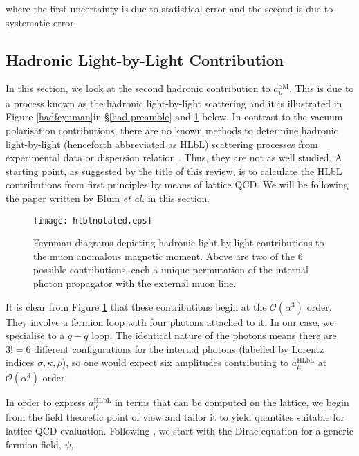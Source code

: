 \documentclass{article}
\numberwithin{equation}{section} %
\begin{document}
\noindent where the first uncertainty is due to statistical error and the second is due to systematic error. 



\subsection{Hadronic Light-by-Light Contribution}

In this section, we look at the second hadronic contribution to $a_\mu^\mathrm{SM}$. This is due to a process known as the hadronic light-by-light scattering and it is illustrated in Figure \ref{hadfeynman}in \S\ref{had preamble} and \ref{hadlbl} below. In contrast to the vacuum polarisation contributions, there are no known methods to determine hadronic light-by-light (henceforth abbreviated as HLbL) scattering processes from experimental data or dispersion relation \cite{blum}. Thus, they are not as well studied. A starting point, as suggested by the title of this review, is to calculate the HLbL contributions from first principles by means of lattice QCD. We will be following the paper written by Blum \textit{et al.}\cite{blum} in this section.

\begin{figure}[t]
    \centering
    \texttt{[image: hlblnotated.eps]}%
    \caption{Feynman diagrams depicting hadronic light-by-light contributions to the muon anomalous magnetic moment. Above are two of the 6 possible contributions, each a unique permutation of the internal photon propagator with the external muon line.}%
    \label{hadlbl}%
\end{figure}


It is clear from Figure \ref{hadlbl} that these contributions begin at the $\mathcal{O}(\alpha^3)$ order. They involve a fermion loop with four photons attached to it\cite{lehnerg2}. In our case, we specialise to a $q-\bar{q}$ loop. The identical nature of the photons means there are $3!=6$ different configurations for the internal photons (labelled by Lorentz indices $\sigma, \kappa, \rho$), so one would expect six amplitudes contributing to $a_\mu^\mathrm{HLbL}$ at $\mathcal{O}(\alpha^3)$ order.

In order to express $a_\mu^\mathrm{HLbL}$ in terms that can be computed on the lattice, we begin from the field theoretic point of view and tailor it to yield quantites suitable for lattice QCD evaluation. Following \cite{zee}, we start with the Dirac equation for a generic fermion field, $\psi$,
\end{document}
